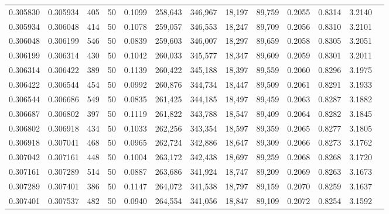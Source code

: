\begin{tabular}{rrrrrrrrrrrrr}
0.305830 & 0.305934 &   405 &  50 &                                     0.1099 & 258,643 & 346,967 &  18,197 &  89,759 & 0.2055 & 0.8314 & 3.2140 \\
0.305934 & 0.306048 &   414 &  50 &                                     0.1078 & 259,057 & 346,553 &  18,247 &  89,709 & 0.2056 & 0.8310 & 3.2101 \\
0.306048 & 0.306199 &   546 &  50 &                                     0.0839 & 259,603 & 346,007 &  18,297 &  89,659 & 0.2058 & 0.8305 & 3.2051 \\
0.306199 & 0.306314 &   430 &  50 &                                     0.1042 & 260,033 & 345,577 &  18,347 &  89,609 & 0.2059 & 0.8301 & 3.2011 \\
0.306314 & 0.306422 &   389 &  50 &                                     0.1139 & 260,422 & 345,188 &  18,397 &  89,559 & 0.2060 & 0.8296 & 3.1975 \\
0.306422 & 0.306544 &   454 &  50 &                                     0.0992 & 260,876 & 344,734 &  18,447 &  89,509 & 0.2061 & 0.8291 & 3.1933 \\
0.306544 & 0.306686 &   549 &  50 &                                     0.0835 & 261,425 & 344,185 &  18,497 &  89,459 & 0.2063 & 0.8287 & 3.1882 \\
0.306687 & 0.306802 &   397 &  50 &                                     0.1119 & 261,822 & 343,788 &  18,547 &  89,409 & 0.2064 & 0.8282 & 3.1845 \\
0.306802 & 0.306918 &   434 &  50 &                                     0.1033 & 262,256 & 343,354 &  18,597 &  89,359 & 0.2065 & 0.8277 & 3.1805 \\
0.306918 & 0.307041 &   468 &  50 &                                     0.0965 & 262,724 & 342,886 &  18,647 &  89,309 & 0.2066 & 0.8273 & 3.1762 \\
0.307042 & 0.307161 &   448 &  50 &                                     0.1004 & 263,172 & 342,438 &  18,697 &  89,259 & 0.2068 & 0.8268 & 3.1720 \\
0.307161 & 0.307289 &   514 &  50 &                                     0.0887 & 263,686 & 341,924 &  18,747 &  89,209 & 0.2069 & 0.8263 & 3.1673 \\
0.307289 & 0.307401 &   386 &  50 &                                     0.1147 & 264,072 & 341,538 &  18,797 &  89,159 & 0.2070 & 0.8259 & 3.1637 \\
0.307401 & 0.307537 &   482 &  50 &                                     0.0940 & 264,554 & 341,056 &  18,847 &  89,109 & 0.2072 & 0.8254 & 3.1592 \\

\end{tabular}
